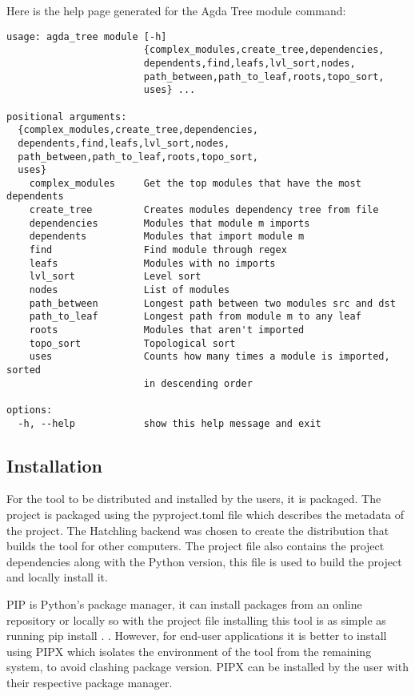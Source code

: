 \noindent
\begin{minipage}{\linewidth}
Here is the help page generated for the Agda Tree module command:

\begin{lstlisting}
usage: agda_tree module [-h]
                        {complex_modules,create_tree,dependencies,
                        dependents,find,leafs,lvl_sort,nodes,
                        path_between,path_to_leaf,roots,topo_sort,
                        uses} ...

positional arguments:
  {complex_modules,create_tree,dependencies,
  dependents,find,leafs,lvl_sort,nodes,
  path_between,path_to_leaf,roots,topo_sort,
  uses}
    complex_modules     Get the top modules that have the most dependents
    create_tree         Creates modules dependency tree from file
    dependencies        Modules that module m imports
    dependents          Modules that import module m
    find                Find module through regex
    leafs               Modules with no imports
    lvl_sort            Level sort
    nodes               List of modules
    path_between        Longest path between two modules src and dst
    path_to_leaf        Longest path from module m to any leaf
    roots               Modules that aren't imported
    topo_sort           Topological sort
    uses                Counts how many times a module is imported, sorted
                        in descending order

options:
  -h, --help            show this help message and exit
\end{lstlisting}
\end{minipage}

\subsection{Installation} \label{sub:Agda Tree Installation}


For the tool to be distributed and installed by the users, it is packaged. The
project is packaged using the \textsf{pyproject.toml} file which describes
the metadata of the project. The Hatchling backend was chosen to create the
distribution that builds the tool for other computers. The
project file also contains the project dependencies along with the Python
version, this file is used to build the project and locally install it.

PIP is Python's package manager, it can install packages from an online
repository or locally so with the project file installing this tool is as
simple as running \textsf{pip install .} . However, for end-user applications
it is better to install using PIPX which isolates the environment of the tool
from the remaining system, to avoid clashing package version. PIPX can be
installed by the user with their respective package manager.


